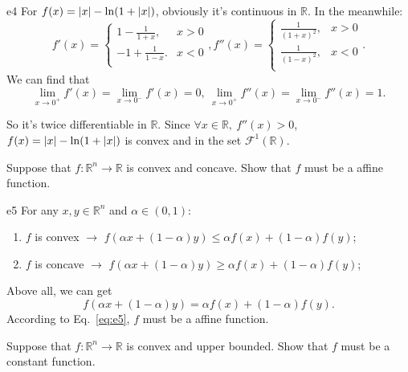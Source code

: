 \documentclass{article}
\newcommand{\R}{\mathbb{R}}
\begin{document}
\begin{PROOF}{e4}
    For \(f(x) = \abs{x} - \ln(1 + \abs{x})\), obviously it's continuous in \(\R\). In the meanwhile:
    \[
        f'(x) = \begin{cases}
            1 - \frac{1}{1+x}, &x > 0\\
            -1 + \frac{1}{1-x}. & x < 0\\
        \end{cases}, f''(x) = \begin{cases}
            \frac{1}{(1+x)^2}, &x > 0\\
            \frac{1}{(1-x)^2}, &x < 0\\
        \end{cases}.
    \]
    We can find that
    \[
        \lim_{x\to 0^+}f'(x)=\lim_{x\to 0^-}f'(x) = 0,~\lim_{x\to 0^+}f''(x)=\lim_{x\to 0^-}f''(x) = 1.
    \]
    
    So it's twice differentiable in \(\R\). Since \(\forall x \in \R,~f''(x) > 0\), \(f(x) = \abs{x} - \ln(1 + \abs{x})\) is convex and in the set \(\mathcal{F}^1(\R)\).
\end{PROOF}

\begin{excercise}\label{e5}
	Suppose that $f: \mathbb{R}^n \rightarrow \mathbb{R}$ is convex and concave. Show that $f$ must be a affine function.
\end{excercise}

\begin{PROOF}{e5}
For any $x, y \in \mathbb{R}^n$ and $\alpha \in (0, 1)$:
\begin{enumerate}
    \item $f$ is convex $\to$ $f(\alpha x + (1-\alpha)y) \le \alpha f(x) + (1-\alpha) f(y)$;
    \item $f$ is concave $\to$ $f(\alpha x + (1-\alpha)y) \ge \alpha f(x) + (1-\alpha) f(y)$;
\end{enumerate}
Above all, we can get
\begin{equation}\label{eq:e5}
    f(\alpha x + (1-\alpha)y) = \alpha f(x) + (1-\alpha) f(y).
\end{equation}
According to  Eq.~\ref{eq:e5}, $f$ must be a affine function.
\end{PROOF}

\begin{excercise}\label{e6}
	Suppose that $f: \mathbb{R}^n \rightarrow \mathbb{R}$ is convex and upper bounded. Show that $f$ must be a constant function.
\end{excercise}
\end{document}
